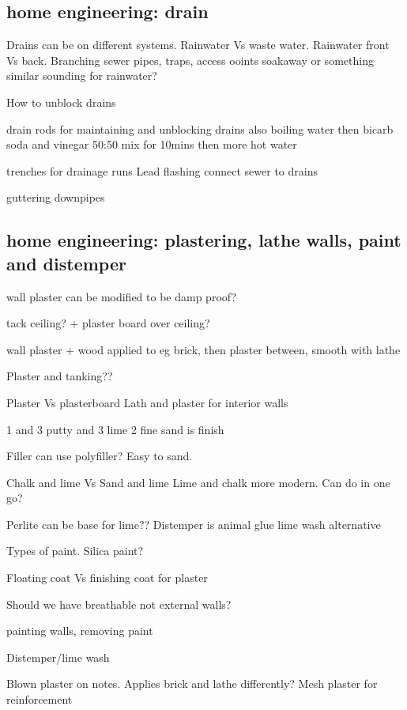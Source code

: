 \subsection{home engineering: drain}
Drains can be on different systems. Rainwater Vs waste water. Rainwater front Vs back. Branching sewer pipes, traps, access ooints
soakaway or something similar sounding for rainwater?

How to unblock drains

drain rods for maintaining and unblocking drains
also boiling water
then bicarb soda and vinegar 50:50 mix for 10mins then more hot water

trenches for drainage runs
Lead flashing
connect sewer to drains

guttering
downpipes
\subsection{home engineering: plastering, lathe walls, paint and distemper}
wall plaster can be modified to be damp proof?

tack ceiling?
+ plaster board over ceiling?

wall plaster
+ wood applied to eg brick, then plaster between, smooth with lathe

Plaster and tanking??

Plaster Vs plasterboard
Lath and plaster for interior walls

1 and 3 putty and
3 lime 2 fine sand is finish

Filler can use polyfiller? Easy to sand.

Chalk and lime Vs
Sand and lime
Lime and chalk more modern. Can do in one go?

Perlite can be base for lime??
Distemper is animal glue lime wash alternative

Types of paint. Silica paint?

Floating coat Vs finishing coat for plaster

Should we have breathable not external walls?

painting walls, removing paint

Distemper/lime wash

Blown plaster on notes. Applies brick and lathe differently?
Mesh plaster for reinforcement

